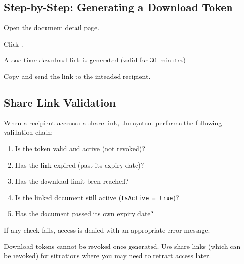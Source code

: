 \subsection{Step-by-Step: Generating a Download Token}
\begin{ugSteps}
  \item Open the document detail page.
  \item Click .
  \item A one-time download link is generated (valid for
        30~minutes).
  \item Copy and send the link to the intended recipient.
\end{ugSteps}

\subsection{Share Link Validation}

When a recipient accesses a share link, the system performs
the following validation chain:

\begin{enumerate}[leftmargin=18pt]
  \item Is the token valid and active (not revoked)?
  \item Has the link expired (past its expiry date)?
  \item Has the download limit been reached?
  \item Is the linked document still active
        (\texttt{IsActive = true})?
  \item Has the document passed its own expiry date?
\end{enumerate}

If any check fails, access is denied with an appropriate
error message.

\begin{ugWarning}
  Download tokens cannot be revoked once generated. Use
  share links (which can be revoked) for situations where
  you may need to retract access later.
\end{ugWarning}

\newpage

